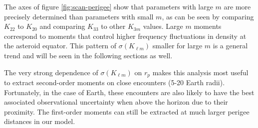 \documentclass[fleqn,usenatbib]{mnras}
\begin{document}


The axes of figure \ref{fig:scan-perigee} show that parameters with large $m$ are more precisely determined than parameters with small $m$, as can be seen by comparing $K_{22}$ to $K_{20}$ and comparing $K_{33}$ to other $K_{3m}$ values. Large $m$ moments correspond to moments that control higher frequency fluctuations in density at the asteroid equator. This pattern of $\sigma(K_{\ell m})$ smaller for large $m$ is a general trend and will be seen in the following sections as well.

The very strong dependence of $\sigma(K_{\ell m})$ on $r_p$ makes this analysis most useful to extract second-order moments on close encounters (5-20 Earth radii). Fortunately, in the case of Earth, these encounters are also likely to have the best associated observational uncertainty when above the horizon due to their proximity. The first-order moments can still be extracted at much larger perigee distances in our model.
\end{document}
